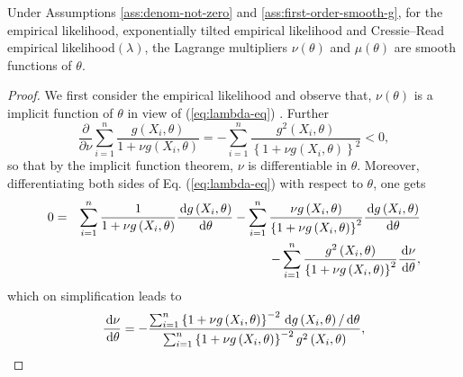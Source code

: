 \begin{lemma}
\label{lem:first-order-smooth-lagmul} Under Assumptions \ref{ass:denom-not-zero} and \ref{ass:first-order-smooth-g}, for the empirical likelihood, exponentially
tilted empirical likelihood and Cressie--Read empirical likelihood$\left(\lambda\right)$,
the Lagrange multipliers $\nu\left(\theta\right)$ and $\mu\left(\theta\right)$
are smooth functions of $\theta.$\end{lemma}
\begin{proof}
We first consider the empirical likelihood and observe that, $\nu\left(\theta\right)$
is a implicit function of $\theta$ in view of (\ref{eq:lambda-eq})
. Further 
\[
\frac{\partial}{\partial\nu}\sum_{i=1}^{n}\frac{g\left(X_{i},\theta\right)}{1+\nu g\left(X_{i},\theta\right)}=-\sum_{i=1}^{n}\frac{g^{2}\left(X_{i},\theta\right)}{\left\{ 1+\nu g\left(X_{i},\theta\right)\right\} ^{2}}<0,
\]
so that by the implicit function theorem, $\nu$ is differentiable
in $\theta$. Moreover, differentiating both sides of Eq. (\ref{eq:lambda-eq})
with respect to $\theta$, one gets
\begin{eqnarray*}
0 & = & \sum_{i=1}^{n}\frac{1}{1+\nu g\left(X_{i},\theta\right)}\frac{\,\mathrm{d} g\left(X_{i},\theta\right)}{\,\mathrm{d}\theta}-\sum_{i=1}^{n}\frac{\nu g\left(X_{i},\theta\right)}{\left\{ 1+\nu g\left(X_{i},\theta\right)\right\} ^{2}}\frac{\,\mathrm{d} g\left(X_{i},\theta\right)}{\,\mathrm{d}\theta}\\
 &  & -\sum_{i=1}^{n}\frac{g^{2}\left(X_{i},\theta\right)}{\left\{ 1+\nu g\left(X_{i},\theta\right)\right\} ^{2}}\frac{\,\mathrm{d}\nu}{\,\mathrm{d}\theta},
\end{eqnarray*}
which on simplification leads to 
\begin{equation}
\frac{\,\mathrm{d}\nu}{\,\mathrm{d}\theta}=-\frac{\sum_{i=1}^{n}\left\{ 1+\nu g\left(X_{i},\theta\right)\right\} ^{-2}\,\mathrm{d} g\left(X_{i},\theta\right)/\,\mathrm{d}\theta}{\sum_{i=1}^{n}\left\{ 1+\nu g\left(X_{i},\theta\right)\right\} ^{-2}g^{2}\left(X_{i},\theta\right)},\label{eq:decreasing-theta-to-nu}
\end{equation}



\end{proof}
